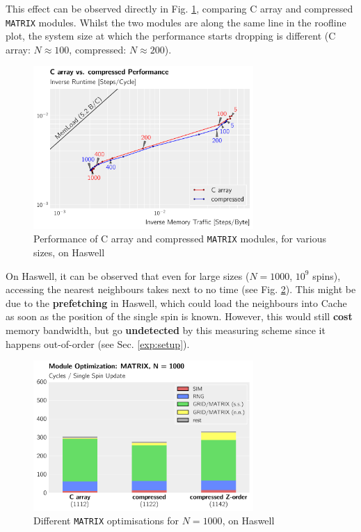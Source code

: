 \documentclass[letterpaper]{article}
\begin{document}
This effect can be observed directly in Fig. \ref{roof:storage}, comparing C array and compressed \texttt{MATRIX} modules. Whilst the two modules are along the same line in the roofline plot, the system size at which the performance starts dropping is different (C array: $N \approx 100$, compressed: $N \approx 200$). 
	\begin{figure}[h]\centering
	\includegraphics[width = 8.36cm]{plots/roofline_1.pdf}
	\caption{Performance of C array and compressed \texttt{MATRIX} modules, for various sizes, on Haswell}
	\label{roof:storage}
	\end{figure}\newline
On Haswell, it can be observed that even for large sizes ($N=1000$, $10^9$ spins), accessing the nearest neighbours takes next to no time (see Fig. \ref{MATRIX:Has:1000}). This might be due to the \textbf{prefetching} in Haswell, which could load the neighbours into Cache as soon as the position of the single spin is known. However, this would still \textbf{cost} memory bandwidth, but go \textbf{undetected} by this measuring scheme since it happens out-of-order (see Sec. \ref{exp:setup}). 
	\begin{figure}[h]\centering
	  \includegraphics[width = 8.36cm]{plots/dg_1000_3.pdf}
	  \caption{Different \texttt{MATRIX} optimisations for $N = 1000$, on Haswell}
	  \label{MATRIX:Has:1000}
	\end{figure}
\end{document}
